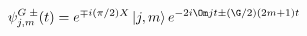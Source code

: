 \begin{equation}
\psi^{G\;\pm}_{j,m}(t)=e^{\mp i({\pi}/{2})X}\,|j,m\rangle \,
	e^{-2i\Om jt\pm (\G /2)(2m+1)t}
\label{eq:gamow}
\end{equation}

